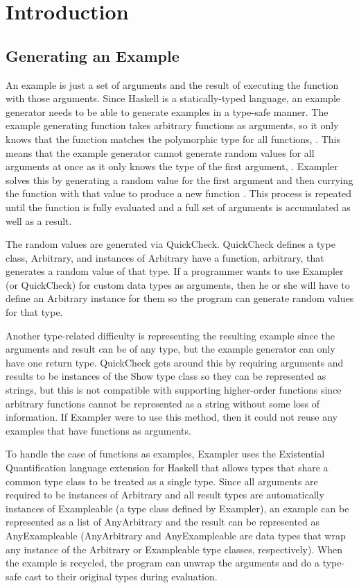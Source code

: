 \section{Introduction}

\subsection{Generating an Example}

An example is just a set of arguments and the result of executing the function with those arguments.
Since Haskell is a statically-typed language, an example generator needs to be able to generate examples in a type-safe manner.
The example generating function takes arbitrary functions as arguments, so it only knows that the function matches the polymorphic type for all functions, .
This means that the example generator cannot generate random values for all arguments at once as it only knows the type of the first argument, .
Exampler solves this by generating a random value for the first argument and then currying the function with that value to produce a new function .
This process is repeated until the function is fully evaluated and a full set of arguments is accumulated as well as a result.

The random values are generated via QuickCheck.
QuickCheck defines a type class, Arbitrary, and instances of Arbitrary have a function, arbitrary, that generates a random value of that type.
If a programmer wants to use Exampler (or QuickCheck) for custom data types as arguments, then he or she will have to define an Arbitrary instance for them so the program can generate random values for that type.

Another type-related difficulty is representing the resulting example since the arguments and result can be of any type, but the example generator can only have one return type.
QuickCheck gets around this by requiring arguments and results to be instances of the Show type class so they can be represented as strings, but this is not compatible with supporting higher-order functions since arbitrary functions cannot be represented as a string without some loss of information.
If Exampler were to use this method, then it could not reuse any examples that have functions as arguments.


To handle the case of functions as examples, Exampler uses the Existential Quantification language extension for Haskell that allows types that share a common type class to be treated as a single type.
Since all arguments are required to be instances of Arbitrary and all result types are automatically instances of Exampleable (a type class defined by Exampler), an example can be represented as a list of AnyArbitrary and the result can be represented as AnyExampleable (AnyArbitrary and AnyExampleable are data types that wrap any instance of the Arbitrary or Exampleable type classes, respectively).
When the example is recycled, the program can unwrap the arguments and do a type-safe cast to their original types during evaluation.

